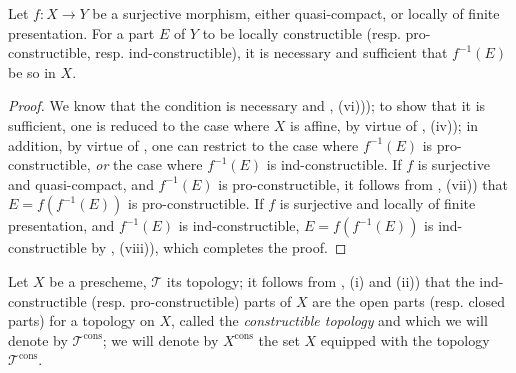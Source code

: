 \begin{corollary}[1.9.12]
\label{IV.1.9.12}
Let $f:X\to Y$ be a surjective morphism, either quasi-compact, or locally of finite presentation.
For a part $E$ of $Y$ to be locally constructible (resp. pro-constructible, resp. ind-constructible), it is necessary and sufficient that $f^{-1}(E)$ be so in $X$.
\end{corollary}


\begin{proof}
We know that the condition is necessary  and , (vi))); to show that it is sufficient, one is reduced to the case where $X$ is affine, by virtue of , (iv)); in addition, by virtue of , one can restrict to the case where $f^{-1}(E)$ is pro-constructible, \emph{or} the case where $f^{-1}(E)$ is ind-constructible.
If $f$ is surjective and quasi-compact, and $f^{-1}(E)$ is pro-constructible, it follows from , (vii)) that $E=f(f^{-1}(E))$ is pro-constructible.
If $f$ is surjective and locally of finite presentation, and $f^{-1}(E)$ is ind-constructible, $E=f(f^{-1}(E))$ is ind-constructible by , (viii)), which completes the proof.
\end{proof}

\begin{env}[1.9.13]
\label{IV.1.9.13}
Let $X$ be a prescheme, $\mathscr{T}$ its topology; it follows from , (i) and (ii)) that the ind-constructible (resp. pro-constructible) parts of $X$ are the open parts (resp. closed parts) for a topology on $X$, called the \emph{constructible topology} and which we will denote by $\mathscr{T}^{\mathrm{cons}}$; we will denote by $X^{\mathrm{cons}}$ the set $X$ equipped with the topology $\mathscr{T}^{\mathrm{cons}}$.
\end{env}

